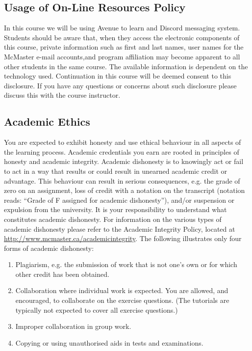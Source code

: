 \documentclass{article}
\begin{document}
\subsection{Usage of On-Line Resources Policy}
\label{sec:orga5267bd}
In this course we will be using Avenue to learn and Discord messaging system.
Students should be aware that, when they access the electronic components of
this course, private information such as first and last names, user names for
the McMaster e-mail accounts,and program affiliation may become apparent to
all other students in the same course. The available information is dependent
on the technology used. Continuation in this course will be deemed consent to
this disclosure. If you have any questions or concerns about such disclosure
please discuss this with the course instructor.

\subsection{Academic Ethics}
\label{sec:org92551b2}

You are expected to exhibit honesty and use ethical behaviour in all aspects of the learning process. Academic credentials you earn are rooted in principles of honesty and academic integrity. 
Academic dishonesty is to knowingly act or fail to act in a way that results or could result in unearned academic credit or advantage.
This behaviour can result in serious consequences, e.g. the grade of zero on an assignment, loss of credit with a notation on the transcript
(notation reads: “Grade of F assigned for academic dishonesty”), and/or suspension or expulsion from the university. It is your responsibility to 
understand what constitutes academic dishonesty.
For information on the various types of academic dishonesty please refer to the Academic Integrity Policy, located at \url{http://www.mcmaster.ca/academicintegrity}.
The following illustrates only four forms of academic dishonesty:
\begin{enumerate}
\item Plagiarism, e.g. the submission of work that is not one’s own or for which other credit has been obtained.
\item Collaboration where individual work is expected. You are allowed, and encouraged, to collaborate on the exercise questions. (The tutorials are typically not expected to cover all exercise questions.)
\item Improper collaboration in group work.
\item Copying or using unauthorised aids in tests and examinations.
\end{enumerate}
\end{document}
